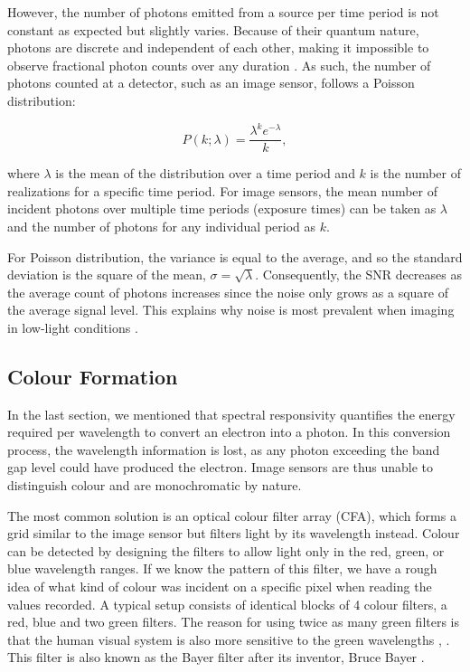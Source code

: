 However, the number of photons emitted from a source per time period is not constant as expected but slightly varies. Because of their quantum nature, photons are discrete and independent of each other, making it impossible to observe fractional photon counts over any duration  \cite[61-67]{nakamura}. As such, the number of photons counted at a detector, such as an image sensor, follows a Poisson distribution:

\begin{equation}
\label{eq:poisson}
P(k; \lambda) = \frac{\lambda^k e^{-\lambda}}{k},
\end{equation}

where $\lambda$ is the mean of the distribution over a time period and $k$ is the number of realizations for a specific time period. For image sensors, the mean number of incident photons over multiple time periods (exposure times) can be taken as $\lambda$ and the number of photons for any individual period as $k$. 

For Poisson distribution, the variance is equal to the average, and so the standard deviation is the square of the mean, $\sigma = \sqrt{\lambda}$. Consequently, the SNR decreases as the average count of photons increases since the noise only grows as a square of the average signal level. This explains why noise is most prevalent when imaging in low-light conditions \cite[62, chapter. 3]{rowlands2020physics}.

\subsection{Colour Formation}
\label{ss:colour}

In the last section, we mentioned that spectral responsivity quantifies the energy required per wavelength to convert an electron into a photon. In this conversion process, the wavelength information is lost, as any photon exceeding the band gap level could have produced the electron. Image sensors are thus unable to distinguish colour and are monochromatic by nature.

The most common solution is an optical colour filter array (CFA), which forms a grid similar to the image sensor but filters light by its wavelength instead. Colour can be detected by designing the filters to allow light only in the red, green, or blue wavelength ranges. If we know the pattern of this filter, we have a rough idea of what kind of colour was incident on a specific pixel when reading the values recorded. A typical setup consists of identical blocks of 4 colour filters, a red, blue and two green filters. The reason for using twice as many green filters is that the human visual system is also more sensitive to the green wavelengths \cite[36]{Ramanath}, \cite[62-63]{nakamura}. This filter is also known as the Bayer filter after its inventor, Bruce Bayer \cite{Bayer1976}.

